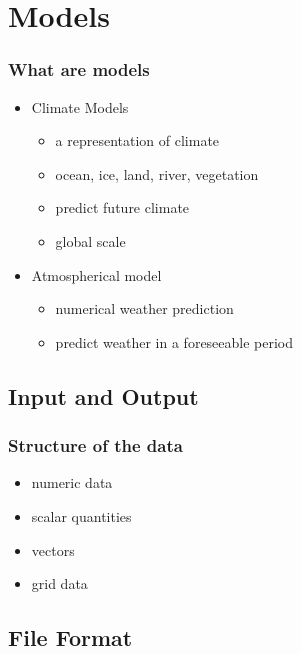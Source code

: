 \documentclass[compress]{beamer}
\begin{document}
\section{Models}
\begin{frame}
    \frametitle{What are models}

    \begin{itemize}
		\item Climate Models
		\begin{itemize}
			\item a representation of climate
			\item ocean, ice, land, river, vegetation
			\item predict future climate
			\item global scale
		\end{itemize}
		\item Atmospherical model
		\begin{itemize}
			\item numerical weather prediction
			\item predict weather in a foreseeable period
		\end{itemize}
    \end{itemize}

\end{frame}


\subsection{Input and Output}

\begin{frame}[fragile]
	\frametitle{Structure of the data}

		\begin{itemize}
		    \item numeric data
			\item scalar quantities
			\item vectors
			\item grid data
		\end{itemize}

\end{frame}

\subsection{File Format}
\end{document}
